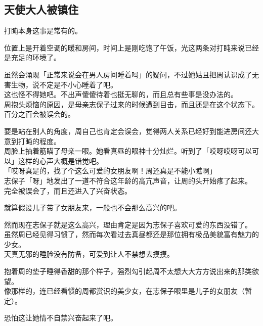 \subsection{天使大人被镇住}

打盹本身这事是常有的。

位置上是开着空调的暖和房间，时间上是刚吃饱了午饭，光这两条对打盹来说已经是充足的环境了。

虽然会涌现「正常来说会在男人房间睡着吗」的疑问，不过她姑且把周认识成了无害生物，说不定是不小心睡着了吧。\\

这也怪不得她吧。不出声傻傻待着也挺无聊的，而且总有些事是没办法的。\\

周抱头烦恼的原因，是母亲志保子过来的时候遭到目击，而且还是在这个状态下。\\

百分之百会被误会的。

要是站在别人的角度，周自己也肯定会误会，觉得两人关系已经好到能进房间还大意到打盹的程度。\\

周脸上抽着筋瞄了母亲一眼。她看真昼的眼神十分灿烂。听到了「哎呀哎呀可以可以」这样的心声大概是错觉吧。\\

「哎呀真是的，找了个这么可爱的女朋友啊！周还真是不能小瞧啊」\\

志保子「呀」地发出了一道不符合这年龄的高亢声音，让周的头开始疼了起来。\\

完全被误会了，而且还进入了兴奋状态。

就算假设儿子带了女朋友来，一般也不会那么高兴的吧。

然而现在志保子就是这么高兴，理由肯定是因为志保子喜欢可爱的东西没错了。\\

虽然周已经见得习惯了，然而每次看过去真昼都还是那位拥有极品美貌富有魅力的少女。\\

天真无邪的睡脸没有防备，可爱到让人不禁想去摸摸。

抱着周的垫子睡得香甜的那个样子，强烈勾引起周不太想大大方方说出来的那类欲望。\\

像那样的，连已经看惯的周都赏识的美少女，在志保子眼里是儿子的女朋友（暂定）。

恐怕这让她情不自禁兴奋起来了吧。\\

